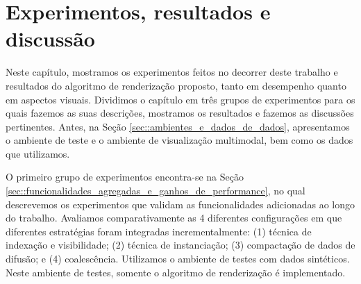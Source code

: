 \chapter{Experimentos, resultados e discussão}
\label{sec::experimentos}

Neste capítulo, mostramos os experimentos feitos no decorrer deste trabalho e resultados do algoritmo de renderização proposto, tanto em desempenho quanto em aspectos visuais.
Dividimos o capítulo em três grupos de experimentos para os quais fazemos as suas descrições, mostramos os resultados e fazemos as discussões pertinentes.
 Antes, na Seção \ref{sec::ambientes_e_dados_de_dados}, apresentamos o ambiente de teste e o ambiente de visualização multimodal, bem como os dados que utilizamos. 



 O primeiro grupo de experimentos encontra-se na Seção \ref{sec::funcionalidades_agregadas_e_ganhos_de_performance}, no qual descrevemos os experimentos que validam as funcionalidades adicionadas ao longo do trabalho. Avaliamos comparativamente as 4 diferentes configurações em que diferentes estratégias foram integradas incrementalmente: (1) técnica de indexação e visibilidade; (2) técnica de instanciação; (3) compactação de dados de difusão; e (4) coalescência. Utilizamos o ambiente de testes com dados sintéticos. Neste ambiente de testes, somente o algoritmo de renderização é implementado.
 

